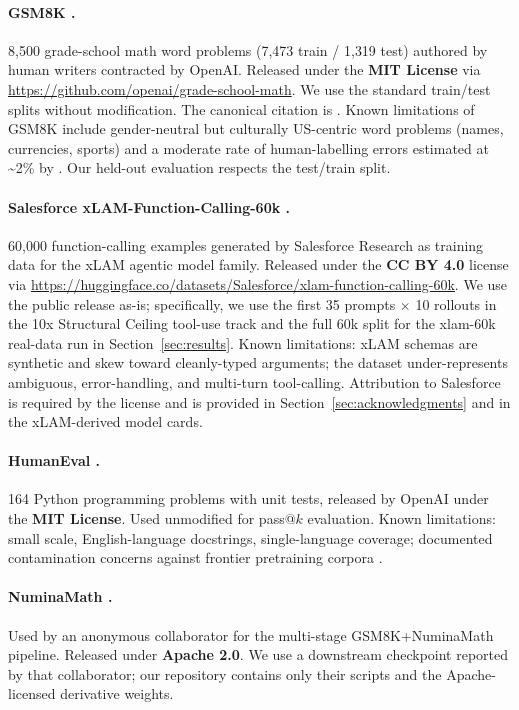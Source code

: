 \documentclass{article}
\begin{document}
\paragraph{GSM8K \cite{cobbe2021training}.}
8{,}500 grade-school math word problems (7{,}473 train / 1{,}319 test)
authored by human writers contracted by OpenAI. Released under the
\textbf{MIT License} via \url{https://github.com/openai/grade-school-math}.
We use the standard train/test splits without modification. The canonical
citation is \citet{cobbe2021training}. Known limitations of GSM8K include
gender-neutral but culturally US-centric word problems (names, currencies,
sports) and a moderate rate of human-labelling errors estimated at
\textasciitilde 2\% by \cite{zhang2024gsm1k}. Our held-out evaluation
respects the test/train split.

\paragraph{Salesforce xLAM-Function-Calling-60k \cite{liu2024xlam}.}
60{,}000 function-calling examples generated by Salesforce Research as
training data for the xLAM agentic model family. Released under the
\textbf{CC BY 4.0} license via \url{https://huggingface.co/datasets/Salesforce/xlam-function-calling-60k}.
We use the public release as-is; specifically, we use the first 35 prompts
$\times$ 10 rollouts in the 10x Structural Ceiling tool-use track and the
full 60k split for the xlam-60k real-data run in Section~\ref{sec:results}.
Known limitations: xLAM schemas are synthetic and skew toward cleanly-typed
arguments; the dataset under-represents ambiguous, error-handling, and
multi-turn tool-calling. Attribution to Salesforce is required by the
license and is provided in Section~\ref{sec:acknowledgments} and in the
xLAM-derived model cards.

\paragraph{HumanEval \cite{chen2021codex}.}
164 Python programming problems with unit tests, released by OpenAI under
the \textbf{MIT License}. Used unmodified for pass@$k$ evaluation. Known
limitations: small scale, English-language docstrings, single-language
coverage; documented contamination concerns against frontier pretraining
corpora \cite{riddell2024contamination}.

\paragraph{NuminaMath \cite{li2024numinamath}.}
Used by an anonymous collaborator for the multi-stage
GSM8K+NuminaMath pipeline. Released under \textbf{Apache 2.0}. We use a
downstream checkpoint reported by that collaborator; our repository contains only their
scripts and the Apache-licensed derivative weights.
\end{document}
